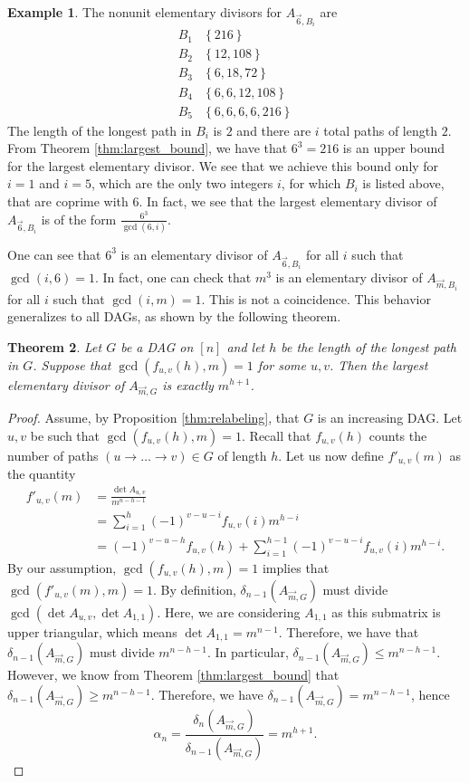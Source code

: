 \documentclass[12pt]{amsart}
\newtheorem{thm}{Theorem}[section]
\theoremstyle{definition}
\newtheorem{example}[thm]{Example}
\numberwithin{equation}{section}
\renewcommand\>{\rangle}
\newcommand\<{\langle}
\newcommand\0{\mathbf{0}}
\newcommand\set[1]{\left\{#1\right\}}
\begin{document}
\begin{example}
	The nonunit elementary divisors for $A_{\vec{6}, B_i}$ are
	\[\begin{array}{c|r}
		B_1 & \set{216}\\
		B_2 & \set{12, 108}\\
		B_3 & \set{6,18,72}\\
		B_4 & \set{6,6, 12,108}\\
		B_5 & \set{6, 6, 6, 6, 216}
	\end{array}\]
	The length of the longest path in $B_i$ is $2$ and there are $i$ total paths of length $2$. 
	From Theorem \ref{thm:largest_bound}, we have that $6^{3} = 216$ is an upper bound for the largest elementary divisor. 
	We see that we achieve this bound only for $i = 1$ and $i=5$, which are the only two integers $i$, for which $B_i$ is listed above, that are coprime with $6$. 
	In fact, we see that the largest elementary divisor of $A_{\vec{6}, B_i}$ is of the form $\frac{6^3}{\gcd(6,i)}$.
\end{example}

One can see that $6^{3}$ is an elementary divisor of $A_{\vec{6}, B_i}$ for all $i$ such that $\gcd(i,6) = 1$. 
In fact, one can check that $m^{3}$ is an elementary divisor of $A_{\vec{m}, B_i}$ for all $i$ such that $\gcd(i,m) = 1$. 
This is not a coincidence. 
This behavior generalizes to all DAGs, as shown by the following theorem.

\begin{thm}\label{thm:unique_largest_eq}
	Let $G$ be a DAG on $[n]$ and let $h$ be the length of the longest path in $G$. 
	Suppose that $\gcd(f_{u,v}(h),m) = 1$ for some $u,v$. 
	Then the largest elementary divisor of $A_{\vec{m}, G}$ is exactly $m^{h+1}$.
\end{thm}

\begin{proof}	
	Assume, by Proposition \ref{thm:relabeling}, that $G$ is an increasing DAG.
	Let $u,v$ be such that $\gcd(f_{u,v}(h), m) = 1$. 
	Recall that $f_{u,v}(h)$ counts the number of paths $(u\to \dots \to v) \in G$ of length $h$. 
	Let us now define $f'_{u,v}(m)$ as the quantity
	\begin{align*}
		f'_{u,v}(m) &= \frac{\det A_{u,v}}{m^{n-h-1}} \\
		&= \sum_{i=1}^{h} (-1)^{v-u-i} f_{u,v}(i) m^{h-i} \\
		&= (-1)^{v-u-h}f_{u,v}(h) + \sum_{i=1}^{h-1} (-1)^{v-u-i} f_{u,v}(i) m^{h-i}.
	\end{align*}
	By our assumption, $\gcd(f_{u,v}(h),m) = 1$ implies that $\gcd(f'_{u,v}(m), m) = 1$. 
	By definition, $\delta_{n-1}(A_{\vec{m}, G})$ must divide $\gcd(\det A_{u,v}, \det A_{1,1})$. 
	Here, we are considering $A_{1,1}$ as this submatrix is upper triangular, which means $\det A_{1,1} = m^{n-1}$. 
	Therefore, we have that $\delta_{n-1}(A_{\vec{m}, G})$ must divide $m^{n-h-1}$. 
	In particular, $\delta_{n-1}(A_{\vec{m}, G}) \leq m^{n-h-1}$. 
	However, we know from Theorem \ref{thm:largest_bound} that $\delta_{n-1}(A_{\vec{m}, G}) \geq m^{n-h-1}$. 
	Therefore, we have $\delta_{n-1}(A_{\vec{m}, G}) = m^{n-h-1}$, hence
	\[
	\alpha_n = \frac{\delta_n(A_{\vec{m}, G})}{\delta_{n-1}(A_{\vec{m}, G})} = m^{h+1}.
	\]
\end{proof}
\end{document}
